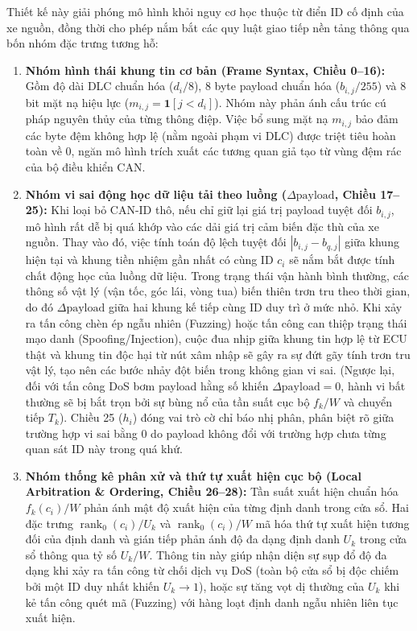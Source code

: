 \documentclass[12pt, a4paper, reqno, oneside]{book}
\begin{document}
Thiết kế này giải phóng mô hình khỏi nguy cơ học thuộc từ điển ID cố định của xe nguồn, đồng thời cho phép nắm bắt các quy luật giao tiếp nền tảng thông qua bốn nhóm đặc trưng tương hỗ:
\begin{enumerate}
    \item \textbf{Nhóm hình thái khung tin cơ bản (Frame Syntax, Chiều 0--16):} Gồm độ dài DLC chuẩn hóa ($d_i / 8$), 8 byte payload chuẩn hóa ($b_{i,j} / 255$) và 8 bit mặt nạ hiệu lực ($m_{i,j} = \mathbf{1}[j < d_i]$). Nhóm này phản ánh cấu trúc cú pháp nguyên thủy của từng thông điệp. Việc bổ sung mặt nạ $m_{i,j}$ bảo đảm các byte đệm không hợp lệ (nằm ngoài phạm vi DLC) được triệt tiêu hoàn toàn về 0, ngăn mô hình trích xuất các tương quan giả tạo từ vùng đệm rác của bộ điều khiển CAN.
    \item \textbf{Nhóm vi sai động học dữ liệu tải theo luồng ($\Delta\text{payload}$, Chiều 17--25):} Khi loại bỏ CAN-ID thô, nếu chỉ giữ lại giá trị payload tuyệt đối $b_{i,j}$, mô hình rất dễ bị quá khớp vào các dải giá trị cảm biến đặc thù của xe nguồn. Thay vào đó, việc tính toán độ lệch tuyệt đối $|b_{i,j} - b_{q,j}|$ giữa khung hiện tại và khung tiền nhiệm gần nhất có cùng ID $c_i$ sẽ nắm bắt được tính chất động học của luồng dữ liệu. Trong trạng thái vận hành bình thường, các thông số vật lý (vận tốc, góc lái, vòng tua) biến thiên trơn tru theo thời gian, do đó $\Delta\text{payload}$ giữa hai khung kế tiếp cùng ID duy trì ở mức nhỏ. Khi xảy ra tấn công chèn ép ngẫu nhiên (Fuzzing) hoặc tấn công can thiệp trạng thái mạo danh (Spoofing/Injection), cuộc đua nhịp giữa khung tin hợp lệ từ ECU thật và khung tin độc hại từ nút xâm nhập sẽ gây ra sự đứt gãy tính trơn tru vật lý, tạo nên các bước nhảy đột biến trong không gian vi sai. (Ngược lại, đối với tấn công DoS bơm payload hằng số khiến $\Delta\text{payload} = 0$, hành vi bất thường sẽ bị bắt trọn bởi sự bùng nổ của tần suất cục bộ $f_k/W$ và chuyển tiếp $T_k$). Chiều 25 ($h_i$) đóng vai trò cờ chỉ báo nhị phân, phân biệt rõ giữa trường hợp vi sai bằng 0 do payload không đổi với trường hợp chưa từng quan sát ID này trong quá khứ.
    \item \textbf{Nhóm thống kê phân xử và thứ tự xuất hiện cục bộ (Local Arbitration \& Ordering, Chiều 26--28):} Tần suất xuất hiện chuẩn hóa $f_k(c_i) / W$ phản ánh mật độ xuất hiện của từng định danh trong cửa sổ. Hai đặc trưng $\operatorname{rank}_0(c_i)/U_k$ và $\operatorname{rank}_0(c_i)/W$ mã hóa thứ tự xuất hiện tương đối của định danh và gián tiếp phản ánh độ đa dạng định danh $U_k$ trong cửa sổ thông qua tỷ số $U_k/W$. Thông tin này giúp nhận diện sự sụp đổ độ đa dạng khi xảy ra tấn công từ chối dịch vụ DoS (toàn bộ cửa sổ bị độc chiếm bởi một ID duy nhất khiến $U_k \to 1$), hoặc sự tăng vọt dị thường của $U_k$ khi kẻ tấn công quét mã (Fuzzing) với hàng loạt định danh ngẫu nhiên liên tục xuất hiện.

\end{enumerate}
\end{document}
